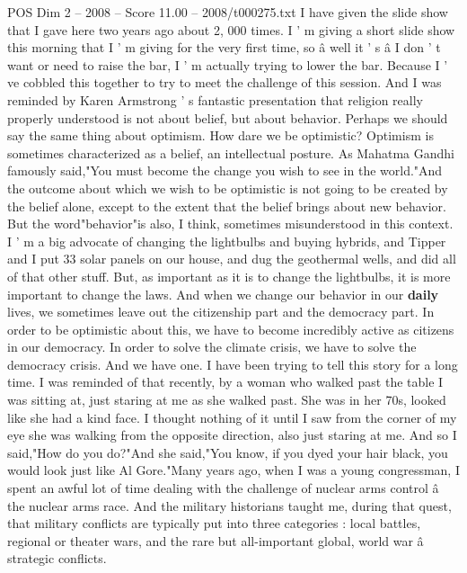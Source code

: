 \begin{textsample}{POS Dim 2 – 2008 – Score 11.00 – 2008/t000275.txt}  \label{ex:f2_pos_073}
I have given the slide show that I gave here two years ago about 2, 000 times.
I ' m giving a short slide show this morning that I ' m giving for the very first time, so â well it ' s â I don ' t want or need to raise the bar, I ' m actually trying to lower the bar.
Because I ' ve cobbled this together to try to meet the challenge of this session.
And I was reminded by Karen Armstrong ' s fantastic presentation that religion really properly understood is not about belief, but about behavior.
Perhaps we should say the same thing about optimism.
How dare we be optimistic?
Optimism is sometimes characterized as a belief, an intellectual posture.
As Mahatma Gandhi famously said,"You must become the change you wish to see in the world."And the outcome about which we wish to be optimistic is not going to be created by the belief alone, except to the extent that the belief brings about new behavior.
But the word"behavior"is also, I think, sometimes misunderstood in this context.
I ' m a big advocate of changing the lightbulbs and buying hybrids, and Tipper and I put 33 solar panels on our house, and dug the geothermal wells, and did all of that other stuff.
But, as important as it is to change the lightbulbs, it is more important to change the laws.
And when we change our behavior in our \textbf{daily} lives, we sometimes leave out the citizenship part and the democracy part.
In order to be optimistic about this, we have to become incredibly active as citizens in our democracy.
In order to solve the climate crisis, we have to solve the democracy crisis.
And we have one.
I have been trying to tell this story for a long time.
I was reminded of that recently, by a woman who walked past the table I was sitting at, just staring at me as she walked past.
She was in her 70s, looked like she had a kind face.
I thought nothing of it until I saw from the corner of my eye she was walking from the opposite direction, also just staring at me.
And so I said,"How do you do?"And she said,"You know, if you dyed your hair black, you would look just like Al Gore."Many years ago, when I was a young congressman, I spent an awful lot of time dealing with the challenge of nuclear arms control â the nuclear arms race.
And the military historians taught me, during that quest, that military conflicts are typically put into three categories : local battles, regional or theater wars, and the rare but all-important global, world war â strategic conflicts.

\end{textsample}

